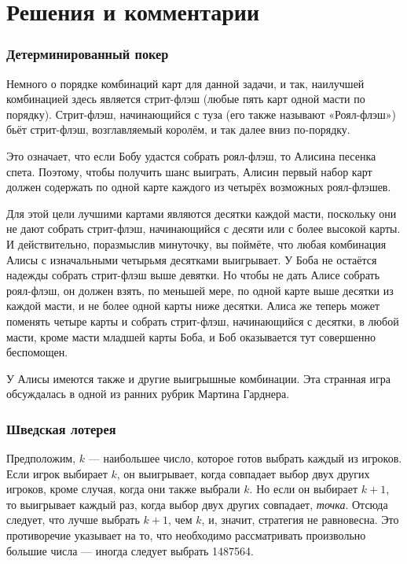 \section*{Решения и комментарии}

\subsubsection*{Детерминированный покер}%

Немного о порядке комбинаций карт для данной задачи, и так, наилучшей комбинацией здесь является стрит-флэш (любые пять карт одной масти по порядку).
Стрит-флэш, начинающийся с туза (его также называют «Роял-флэш») бьёт стрит-флэш, возглавляемый королём, и так далее вниз по-порядку.

Это означает, что если Бобу удастся собрать роял-флэш, то Алисина песенка спета.
Поэтому, чтобы получить шанс выиграть, Алисин первый набор карт должен содержать по одной карте каждого из четырёх возможных роял-флэшев.

Для этой цели лучшими картами являются десятки каждой масти, поскольку они не дают собрать стрит-флэш, начинающийся с десяти или с более высокой карты.
И действительно, поразмыслив минуточку, вы поймёте, что любая комбинация Алисы с изначальными четырьмя десятками выигрывает.
У Боба не остаётся надежды собрать стрит-флэш выше девятки.
Но чтобы не дать Алисе собрать роял-флэш, он должен взять, по меньшей мере, по одной карте выше десятки из каждой масти, и не более одной карты ниже десятки.
Алиса же теперь может поменять четыре карты и собрать стрит-флэш, начинающийся с десятки, в любой масти, кроме масти младшей карты Боба,
и Боб оказывается тут совершенно беспомощен.
\heart

У Алисы имеются также и другие выигрышные комбинации.
Эта странная игра обсуждалась в одной из ранних рубрик Мартина Гарднера. 

\subsubsection*{Шведская лотерея}%

Предположим, $k$ --- наибольшее число, которое готов выбрать каждый из игроков.
Если игрок выбирает $k$, он выигрывает, когда совпадает выбор двух других игроков, кроме случая, когда они также выбрали $k$.
Но если он выбирает $k+1$, то выигрывает каждый раз, когда выбор двух других совпадает, \emph{точка}.
Отсюда следует, что лучше выбрать $k+1$, чем $k$, и, значит, стратегия не равновесна.
Это противоречие указывает на то, что необходимо рассматривать произвольно большие числа --- иногда следует выбрать 1487564.
\heart


